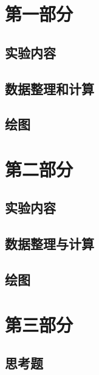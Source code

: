 \documentclass[zihao=5, UTF8]{article}
\theoremstyle{MyLineTheoremStyle} %
\theoremstyle{MyBlockTheoremStyle} %
\theoremstyle{MySubsubsectionStyle} %
\begin{document}
\section{第一部分}\thispagestyle{fancy} 

\subsection{实验内容}

\subsection{数据整理和计算}


\subsection{绘图}


\section{第二部分}

\subsection{实验内容}

\subsection{数据整理与计算}

\subsection{绘图}

\section{第三部分}

\subsection{思考题}
\end{document}
